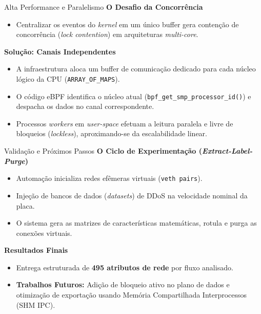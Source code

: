 \documentclass[aspectratio=169]{beamer}
\begin{document}
\begin{frame}{Alta Performance e Paralelismo}
    \textbf{O Desafio da Concorrência}
    \begin{itemize}
        \item Centralizar os eventos do \textit{kernel} em um único buffer gera contenção de concorrência (\textit{lock contention}) em arquiteturas \textit{multi-core}.
    \end{itemize}
    
    \textbf{Solução: Canais Independentes}
    \begin{itemize}
        \item A infraestrutura aloca um buffer de comunicação dedicado para cada núcleo lógico da CPU (\texttt{ARRAY\_OF\_MAPS}).
        \item O código eBPF identifica o núcleo atual (\texttt{bpf\_get\_smp\_processor\_id()}) e despacha os dados no canal correspondente.
        \item Processos \textit{workers} em \textit{user-space} efetuam a leitura paralela e livre de bloqueios (\textit{lockless}), aproximando-se da escalabilidade linear.
    \end{itemize}
\end{frame}

\begin{frame}{Validação e Próximos Passos}
    \textbf{O Ciclo de Experimentação (\textit{Extract-Label-Purge})}
    \begin{itemize}
        \item Automação inicializa redes efêmeras virtuais (\texttt{veth pairs}).
        \item Injeção de bancos de dados (\textit{datasets}) de DDoS na velocidade nominal da placa.
        \item O sistema gera as matrizes de características matemáticas, rotula e purga as conexões virtuais.
    \end{itemize}
    
    \textbf{Resultados Finais}
    \begin{itemize}
        \item Entrega estruturada de \textbf{495 atributos de rede} por fluxo analisado.
        \item \textbf{Trabalhos Futuros:} Adição de bloqueio ativo no plano de dados e otimização de exportação usando Memória Compartilhada Interprocessos (SHM IPC).
    \end{itemize}
\end{frame}
\end{document}
